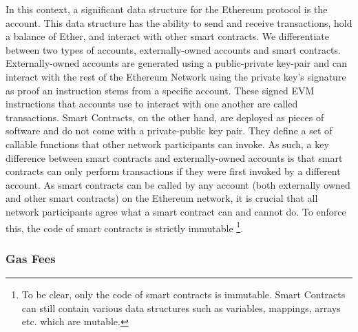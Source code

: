 \documentclass[letterpaper,twocolumn,10pt]{article}
\begin{document}
In this context, a significant data structure for the Ethereum protocol is the account. This data structure has the ability to send and receive transactions, hold a balance of Ether, and interact with other smart contracts. We differentiate between two types of accounts, externally-owned accounts and smart contracts. Externally-owned accounts are generated using a public-private key-pair and can interact with the rest of the Ethereum Network using the private key's signature as proof an instruction stems from a specific account. These signed EVM instructions that accounts use to interact with one another are called transactions.  Smart Contracts, on the other hand, are deployed as pieces of software and do not come with a private-public key pair. They define a set of callable functions that other network participants can invoke. As such, a key difference between smart contracts and externally-owned accounts is that smart contracts can only perform transactions if they were first invoked by a different account. As smart contracts can be called by any account (both externally owned and other smart contracts) on the Ethereum network, it is crucial that all network participants agree what a smart contract can and cannot do. To enforce this, the code of smart contracts is strictly immutable \footnote{To be clear, only the code of smart contracts is immutable. Smart Contracts can still contain various data structures such as variables, mappings, arrays etc. which are mutable.}.

\subsubsection{Gas Fees}
\label{subsection:gas}
\end{document}
